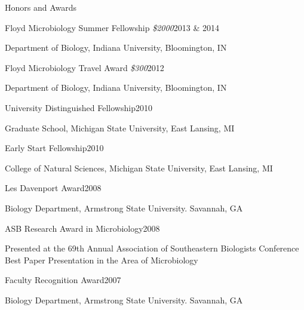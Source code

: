 \documentclass{resume} %
\begin{document}
\begin{rSection}{Honors and Awards}

    \begin{rSubsection}{Floyd Microbiology Summer Fellowship
      {\normalfont \em \$2000}}{2013 \& 2014}{}{}
      \item Department of Biology, Indiana University, Bloomington, IN
    \end{rSubsection}

    \begin{rSubsection}{Floyd Microbiology Travel Award
      {\normalfont \em \$300}}{2012}{}{}
      \item Department of Biology, Indiana University, Bloomington, IN
    \end{rSubsection}

    \begin{rSubsection}{University Distinguished Fellowship}{2010}{}{}
      \item Graduate School, Michigan State University, East Lansing, MI
    \end{rSubsection}

    \begin{rSubsection}{Early Start Fellowship}{2010}{}{}
      \item College of Natural Sciences, Michigan State University, East
      Lansing, MI
    \end{rSubsection}

    \begin{rSubsection}{Les Davenport Award}{2008}{}{}
      \item Biology Department, Armstrong State University. Savannah, GA
    \end{rSubsection}

    \begin{rSubsection}{ASB Research Award in Microbiology}{2008}{}{}
      \item Presented at the 69th Annual Association of Southeastern Biologists
      Conference \\
      Best Paper Presentation in the Area of Microbiology
    \end{rSubsection}

    \begin{rSubsection}{Faculty Recognition Award}{2007}{}{}
      \item Biology Department, Armstrong State University. Savannah, GA
    \end{rSubsection}

\end{rSection}
\end{document}
